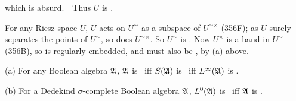 {

\noindent which is absurd.\ \BanG\  Thus $U$ is \wsid.

For any Riesz space $U$, $U$ acts on $U^{\sim}$ as a subspace of
$U^{\sim\times}$ (356F);  as $U$ surely separates the points of
$U^{\sim}$, so does $U^{\sim\times}$.   So $U^{\sim}$ is \wsid.   Now
$U^{\times}$ is a
band in $U^{\sim}$ (356B), so is regularly embedded, and must also be
\wsid, by (a) above.
}%

 (a) For any Boolean algebra $\frak A$, $\frak A$
is \wsid\ iff $S(\frak A)$ is \wsid\ iff $L^{\infty}(\frak A)$ is \wsid.

(b) For a Dedekind $\sigma$-complete Boolean algebra $\frak A$,
$L^0(\frak A)$ is \wsid\ iff $\frak A$ is \wsid.

